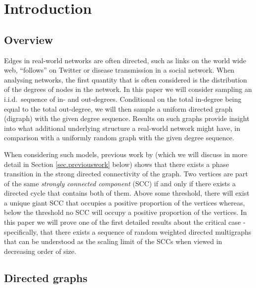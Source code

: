 \section{Introduction}


\subsection{Overview}

Edges in real-world networks are often directed, such as links on the world wide web, ``follows'' on Twitter or disease transmission in a social network. When analysing networks, the first quantity that is often considered is the distribution of the degrees of nodes in the network.  In this paper we will consider sampling an i.i.d.\ sequence of in- and out-degrees. Conditional on the total in-degree being equal to the total out-degree, we will then sample a uniform directed graph (digraph) with the given degree sequence. Results on such graphs provide insight into what additional underlying structure a real-world network might have, in comparison with a uniformly random graph with the given degree sequence.

When considering such models, previous work by \citet{cooperSizeLargestStrongly2004} (which we will discuss in more detail in Section \ref{sec.previouswork} below) shows that there exists a phase transition in the strong directed connectivity of the graph. Two vertices are part of the same \emph{strongly connected component} (SCC) if and only if there exists a directed cycle that contains both of them. Above some threshold, there will exist a unique giant SCC that occupies a positive proportion of the vertices whereas, below the threshold no SCC will occupy a positive proportion of the vertices. In this paper we will prove one of the first detailed results about the critical case - specifically, that there exists a sequence of random weighted directed multigraphs that can be understood as the scaling limit of the SCCs when viewed in decreasing order of size.

\subsection{Directed graphs}

